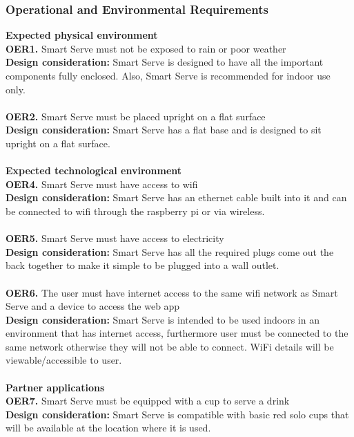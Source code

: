 \documentclass[12pt, titlepage]{article}
\begin{document}
\subsubsection{Operational and Environmental Requirements}
    \textbf{Expected physical environment}\\
        \noindent\textbf{OER1.} Smart Serve must not be exposed to rain or poor weather \\
        \indent\textbf{Design consideration:} Smart Serve is designed to have all the important components fully enclosed. Also, Smart Serve is recommended for indoor use only.\\\\
        \textbf{OER2.} Smart Serve must be placed upright on a flat surface \\
        \indent\textbf{Design consideration:} Smart Serve has a flat base and is designed to sit upright on a flat surface.\\\\
    \textbf{Expected technological environment}\\
        \noindent\textbf{OER4.} Smart Serve must have access to wifi \\
        \indent\textbf{Design consideration:} Smart Serve has an ethernet cable built into it and can be connected to wifi through the raspberry pi or via wireless.\\\\
        \textbf{OER5.} Smart Serve must have access to electricity \\
        \indent\textbf{Design consideration:} Smart Serve has all the required plugs come out the back together to make it simple to be plugged into a wall outlet.\\\\
        \textbf{OER6.} The user must have internet access to the same wifi network as Smart Serve and a device to access the web app \\
        \indent\textbf{Design consideration:} Smart Serve is intended to be used indoors in an environment that has internet access, furthermore user must be connected to the same network otherwise they will not be able to connect. WiFi details will be viewable/accessible to user.\\\\
    \textbf{Partner applications}\\
        \noindent\textbf{OER7.} Smart Serve must be equipped with a cup to serve a drink \\
        \indent\textbf{Design consideration:} Smart Serve is compatible with basic red solo cups that will be available at the location where it is used.
\end{document}
